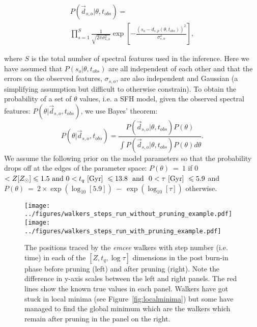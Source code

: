 \documentclass[useAMS,usenatbib]{mn2e}
\begin{document}
\begin{multline}\label{like}
P(\vec{d}_{s, o}|\theta, t_{obs}) = \\ \prod_{s=1}^{S} \frac{1}{\sqrt{2\pi\sigma_{s,o}^2}} \exp{\left[ - \frac{(s_{o} - d_{s, p}(\theta, t_{obs}))^2}{\sigma_{s, o}^2} \right]},
\end{multline}

where $S$ is the total number of spectral features used in the inference. Here we have assumed that $P(s_{o}|\theta, t_{obs})$ are all independent of each other and that the errors on the observed features, $\sigma_{s, o}$, are also independent and Gaussian (a simplifying assumption but difficult to otherwise constrain). To obtain the probability of a set of $\theta$ values, i.e. a SFH model, given the observed spectral features: $P(\theta|\vec{d}_{s,o}, t_{obs})$, we use Bayes' theorem:
 \begin{equation}\label{big}
P(\theta|\vec{d}_{s,o}, t_{obs}) = \frac{P(\vec{d}_{s,o}|\theta, t_{obs})P(\theta)}{\int P(\vec{d}_{s,o} |\theta, t_{obs})P(\theta) d\theta}.
\end{equation}
We assume the following prior on the model parameters so that the probability drops off at the edges of the parameter space: ${P(\theta)~=~1}$ if 0 $< Z [Z_{\odot}] \leq 1.5 \text{ and } 0 < t_q ~\rm{[Gyr]}~ \leq 13.8 ~ \text{ and } ~ 0 < \tau  ~\rm{[Gyr]}~ \leq 5.9$ and ${P(\theta)~=~2\times\exp\left(\log_{10}[5.9]\right)~-~\exp\left(\log_{10}[\tau]\right)}$ otherwise.



\begin{figure*}
\centering
\texttt{[image: ../figures/walkers\_steps\_run\_without\_pruning\_example.pdf]}
\texttt{[image: ../figures/walkers\_steps\_run\_with\_pruning\_example.pdf]}
\caption{The positions traced by the \emph{emcee} walkers with step number (i.e. time) in each of the $[Z, t_q, \log \tau]$ dimensions in the post burn-in phase before pruning (left) and after pruning (right). Note the difference in y-axis scales between the left and right panels. The red lines show the known true values in each panel. Walkers have got stuck in local minima (see Figure~\ref{fig:localminima}) but some have managed to find the global minimum which are the walkers which remain after pruning in the panel on the right.}
\label{fig:comparepruning}
\end{figure*}
\end{document}
